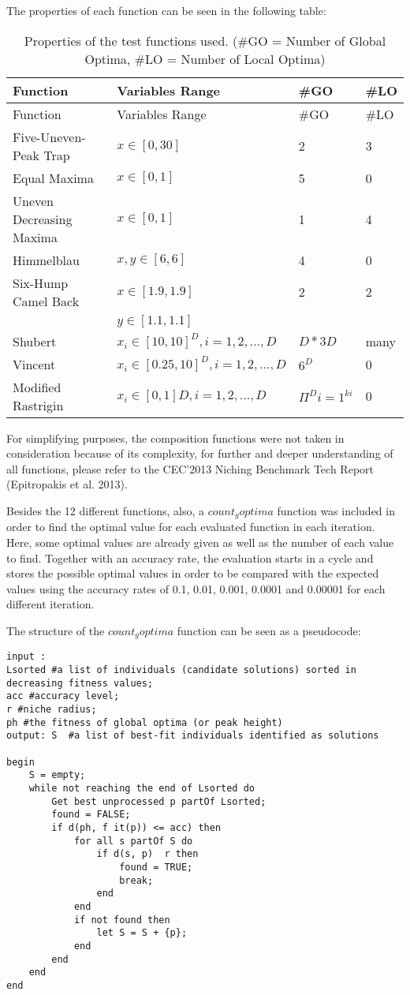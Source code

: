 \documentclass[12pt,a4paper]{article}
\begin{document}
The properties of each function can be seen in the following table:

\begin{longtable}[c]{@{}llll@{}}
\caption{Properties of the test functions used. (\#GO = Number of Global
Optima, \#LO = Number of Local Optima)}\tabularnewline
\toprule
Function & Variables Range & \#GO & \#LO\tabularnewline
\midrule
\endfirsthead
\toprule
Function & Variables Range & \#GO & \#LO\tabularnewline
\midrule
\endhead
Five-Uneven-Peak Trap & \(x \in [0, 30]\) & 2 & 3\tabularnewline
Equal Maxima & \(x \in [0, 1]\) & 5 & 0\tabularnewline
Uneven Decreasing Maxima & \(x \in [0, 1]\) & 1 & 4\tabularnewline
Himmelblau & \(x,y \in [6,6]\) & 4 & 0\tabularnewline
Six-Hump Camel Back & \(x \in [1.9, 1.9]\) & 2 & 2\tabularnewline
& \(y \in [1.1, 1.1]\) & &\tabularnewline
Shubert & \(x_i \in [10,10]^D,i=1,2,...,D\) & \(D * 3D\) &
many\tabularnewline
Vincent & \(x_i \in [0.25,10]^D, i = 1,2,...,D\) & \(6^D\) &
0\tabularnewline
Modified Rastrigin & \(x_i \in [0,1]D, i = 1,2,...,D\) &
\(\Pi^Di=1^{ki}\) & 0\tabularnewline
\bottomrule
\end{longtable}

For simplifying purposes, the composition functions were not taken in
consideration because of its complexity, for further and deeper
understanding of all functions, please refer to the CEC'2013 Niching
Benchmark Tech Report (Epitropakis et al. 2013).

Besides the 12 different functions, also, a \(count_goptima\) function
was included in order to find the optimal value for each evaluated
function in each iteration. Here, some optimal values are already given
as well as the number of each value to find. Together with an accuracy
rate, the evaluation starts in a cycle and stores the possible optimal
values in order to be compared with the expected values using the
accuracy rates of 0.1, 0.01, 0.001, 0.0001 and 0.00001 for each
different iteration.

The structure of the \(count_goptima\) function can be seen as a
pseudocode:

\begin{verbatim}
input : 
Lsorted #a list of individuals (candidate solutions) sorted in decreasing fitness values;           
acc #accuracy level; 
r #niche radius;            
ph #the fitness of global optima (or peak height) 
output: S  #a list of best-fit individuals identified as solutions 

begin 
    S = empty;      
    while not reaching the end of Lsorted do 
        Get best unprocessed p partOf Lsorted;
        found = FALSE;          
        if d(ph, f it(p)) <= acc) then 
            for all s partOf S do                   
                if d(s, p)  r then 
                    found = TRUE; 
                    break; 
                end 
            end 
            if not found then 
                let S = S + {p}; 
            end 
        end 
    end 
end 
\end{verbatim}
\end{document}
